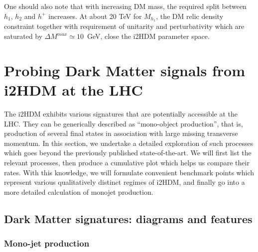 \documentclass[12pt,a4paper]{article}
\begin{document}
{One should also note that with increasing DM mass, the required split between $h_1$, $h_2$ and $h^+$
increases.
At about 20 TeV for $M_{h_1}$, the DM relic density constraint together with 
requirement of unitarity and perturbativity which are saturated by  $\Delta M^{max}\simeq 10$~GeV,
close the i2HDM parameter space.
}




%
\section{Probing Dark Matter signals from i2HDM at the LHC}

 
The i2HDM exhibits various signatures that are potentially accessible at the LHC.
They can be generically described as ``mono-object production'', that is,
production of several final states in association with large missing transverse momentum.
In this section, we undertake a detailed exploration of such processes which goes 
beyond the previously published state-of-the-art.
We will first list the relevant processes, then produce a cumulative plot which
helps us compare their rates. 
With this knowledge, we will formulate convenient benchmark points which
represent various qualitatively distinct regimes of i2HDM, and finally go into a more detailed
calculation of monojet production.


\subsection{Dark Matter signatures: diagrams and features} \label{sec:DMsignatures}

\subsubsection{Mono-jet production}
\end{document}
